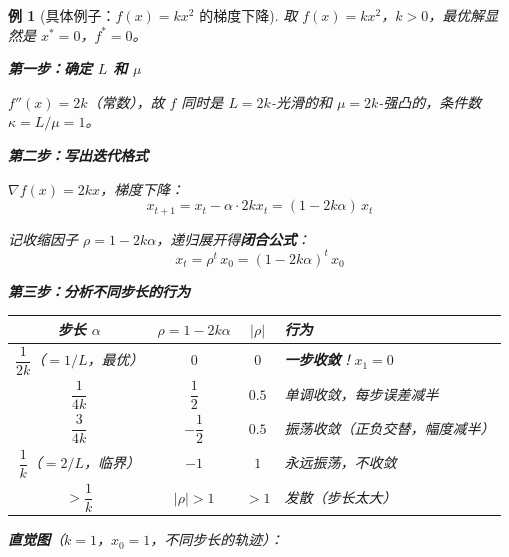 \documentclass[12pt, a4paper]{ctexart}
\newtheorem{example}[theorem]{例}
\begin{document}
\begin{example}[具体例子：$f(x) = kx^2$ 的梯度下降]

取 $f(x) = kx^2$，$k > 0$，最优解显然是 $x^* = 0$，$f^* = 0$。

\textbf{第一步：确定 $L$ 和 $\mu$}

$f''(x) = 2k$（常数），故 $f$ 同时是 $L = 2k$-光滑的和 $\mu = 2k$-强凸的，条件数 $\kappa = L/\mu = 1$。

\textbf{第二步：写出迭代格式}

$\nabla f(x) = 2kx$，梯度下降：
\[
x_{t+1} = x_t - \alpha \cdot 2k x_t = (1 - 2k\alpha)\, x_t
\]

记收缩因子 $\rho = 1 - 2k\alpha$，递归展开得\textbf{闭合公式}：
\[
\boxed{x_t = \rho^t\, x_0 = (1 - 2k\alpha)^t\, x_0}
\]

\textbf{第三步：分析不同步长的行为}

\begin{center}
\begin{tabular}{c|c|c|l}
步长 $\alpha$ & $\rho = 1-2k\alpha$ & $|\rho|$ & 行为 \\
\hline
$\dfrac{1}{2k}$（$= 1/L$，最优） & $0$ & $0$ & \textbf{一步收敛}！$x_1 = 0$ \\[6pt]
$\dfrac{1}{4k}$ & $\dfrac{1}{2}$ & $0.5$ & 单调收敛，每步误差减半 \\[6pt]
$\dfrac{3}{4k}$ & $-\dfrac{1}{2}$ & $0.5$ & 振荡收敛（正负交替，幅度减半） \\[6pt]
$\dfrac{1}{k}$（$= 2/L$，临界） & $-1$ & $1$ & 永远振荡，不收敛 \\[6pt]
$> \dfrac{1}{k}$ & $|\rho|>1$ & $>1$ & 发散（步长太大）
\end{tabular}
\end{center}

\textbf{直觉图}（$k=1$，$x_0 = 1$，不同步长的轨迹）：

\begin{center}
\end{center}
\end{example}
\end{document}

